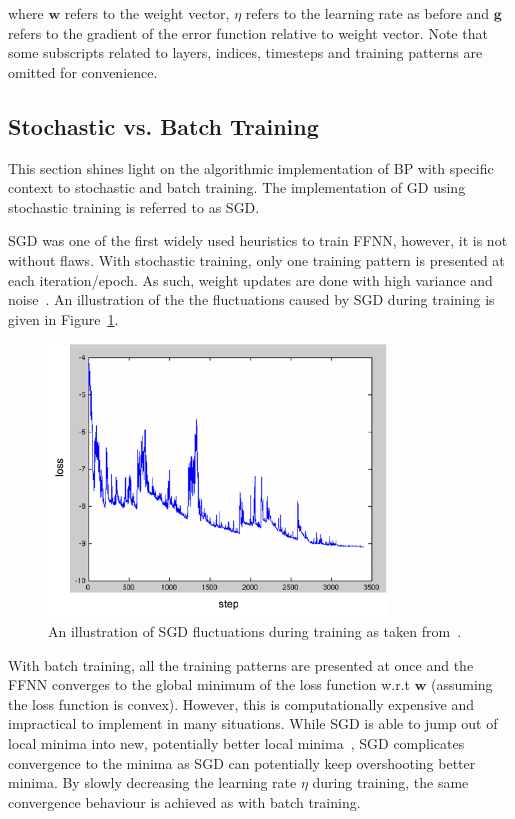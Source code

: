 where $\boldsymbol{w}$ refers to the weight vector, $\eta$ refers to the learning rate as before and $\boldsymbol{g}$ refers to the gradient of the error function relative to weight vector. Note that some subscripts related to layers, indices, timesteps and training patterns are omitted for convenience.

\subsection{Stochastic vs. Batch Training}\label{sec:heuristics:gd:sgd}

This section shines light on the algorithmic implementation of \acs{BP} with specific context to stochastic and batch training. The implementation of \acs{GD} using stochastic training is referred to as \acf{SGD}.

\acs{SGD} was one of the first widely used heuristics to train \acs{FFNN}, however, it is not without flaws. With stochastic training, only one training pattern is presented at each iteration/epoch. As such, weight updates are done with high variance and noise~\cite{ref:ruder:2016}. An illustration of the the fluctuations caused by \acs{SGD} during training is given in Figure~\ref{fig:heuristics:gd:sgd}.

\begin{figure}[htbp]
      \centering
      \includegraphics[width=0.8\textwidth]{images/sgd.pdf}
      \caption{An illustration of \acf{SGD} fluctuations during training as taken from~\cite{ref:sgd:2006}.}
      \label{fig:heuristics:gd:sgd}
\end{figure}

With batch training, all the training patterns are presented at once and the \acs{FFNN} converges to the global minimum of the loss function w.r.t $\boldsymbol{w}$ (assuming the loss function is convex). However, this is computationally expensive and impractical to implement in many situations. While \acs{SGD} is able to jump out of local minima into new, potentially better local minima~\cite{ref:ruder:2016}, \acs{SGD} complicates convergence to the minima as \acs{SGD} can potentially keep overshooting better minima. By slowly decreasing the learning rate $\eta$ during training, the same convergence behaviour is achieved as with batch training.

